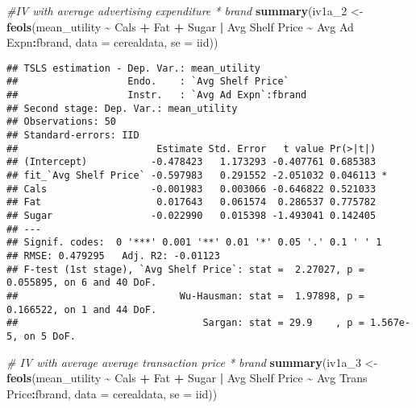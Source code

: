 \documentclass[
]{article}
\newenvironment{Shaded}{\begin{snugshade}}{\end{snugshade}}
\newcommand{\AttributeTok}[1]{\textcolor[rgb]{0.13,0.29,0.53}{#1}}
\newcommand{\CommentTok}[1]{\textcolor[rgb]{0.56,0.35,0.01}{\textit{#1}}}
\newcommand{\FunctionTok}[1]{\textcolor[rgb]{0.13,0.29,0.53}{\textbf{#1}}}
\newcommand{\NormalTok}[1]{#1}
\newcommand{\OtherTok}[1]{\textcolor[rgb]{0.56,0.35,0.01}{#1}}
\newcommand{\SpecialCharTok}[1]{\textcolor[rgb]{0.81,0.36,0.00}{\textbf{#1}}}
\newcommand{\StringTok}[1]{\textcolor[rgb]{0.31,0.60,0.02}{#1}}
\begin{document}
\begin{Shaded}
\begin{Highlighting}[]
\CommentTok{\#IV with average advertising expenditure * brand}
\FunctionTok{summary}\NormalTok{(iv1a\_2 }\OtherTok{\textless{}{-}} \FunctionTok{feols}\NormalTok{(mean\_utility }\SpecialCharTok{\textasciitilde{}}\NormalTok{ Cals }\SpecialCharTok{+}\NormalTok{ Fat }\SpecialCharTok{+}\NormalTok{ Sugar }\SpecialCharTok{|} \StringTok{\textasciigrave{}}\AttributeTok{Avg Shelf Price}\StringTok{\textasciigrave{}} \SpecialCharTok{\textasciitilde{}} \StringTok{\textasciigrave{}}\AttributeTok{Avg Ad Expn}\StringTok{\textasciigrave{}}\SpecialCharTok{:}\NormalTok{fbrand, }\AttributeTok{data =}\NormalTok{ cerealdata, }\AttributeTok{se =} \StringTok{\textquotesingle{}iid\textquotesingle{}}\NormalTok{))}
\end{Highlighting}
\end{Shaded}

\begin{verbatim}
## TSLS estimation - Dep. Var.: mean_utility
##                   Endo.    : `Avg Shelf Price`
##                   Instr.   : `Avg Ad Expn`:fbrand
## Second stage: Dep. Var.: mean_utility
## Observations: 50
## Standard-errors: IID 
##                        Estimate Std. Error   t value Pr(>|t|)    
## (Intercept)           -0.478423   1.173293 -0.407761 0.685383    
## fit_`Avg Shelf Price` -0.597983   0.291552 -2.051032 0.046113 *  
## Cals                  -0.001983   0.003066 -0.646822 0.521033    
## Fat                    0.017643   0.061574  0.286537 0.775782    
## Sugar                 -0.022990   0.015398 -1.493041 0.142405    
## ---
## Signif. codes:  0 '***' 0.001 '**' 0.01 '*' 0.05 '.' 0.1 ' ' 1
## RMSE: 0.479295   Adj. R2: -0.01123
## F-test (1st stage), `Avg Shelf Price`: stat =  2.27027, p = 0.055895, on 6 and 40 DoF.
##                            Wu-Hausman: stat =  1.97898, p = 0.166522, on 1 and 44 DoF.
##                                Sargan: stat = 29.9    , p = 1.567e-5, on 5 DoF.
\end{verbatim}

\begin{Shaded}
\begin{Highlighting}[]
\CommentTok{\# IV with average average transaction price * brand}
\FunctionTok{summary}\NormalTok{(iv1a\_3 }\OtherTok{\textless{}{-}} \FunctionTok{feols}\NormalTok{(mean\_utility }\SpecialCharTok{\textasciitilde{}}\NormalTok{ Cals }\SpecialCharTok{+}\NormalTok{ Fat }\SpecialCharTok{+}\NormalTok{ Sugar  }\SpecialCharTok{|} \StringTok{\textasciigrave{}}\AttributeTok{Avg Shelf Price}\StringTok{\textasciigrave{}} \SpecialCharTok{\textasciitilde{}} \StringTok{\textasciigrave{}}\AttributeTok{Avg Trans Price}\StringTok{\textasciigrave{}}\SpecialCharTok{:}\NormalTok{fbrand, }\AttributeTok{data =}\NormalTok{ cerealdata, }\AttributeTok{se =} \StringTok{\textquotesingle{}iid\textquotesingle{}}\NormalTok{))}
\end{Highlighting}
\end{Shaded}
\end{document}

